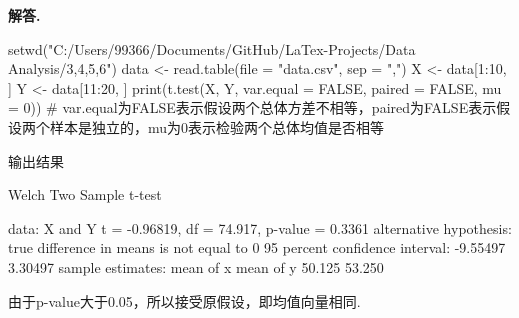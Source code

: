 \documentclass[12pt, a4paper, oneside]{ctexart}
\newenvironment{solution}[1][]{\par\noindent\textbf{#1解答. }}{\smallskip\par}  %
\begin{document}
\begin{solution}
    \begin{rcode}
setwd("C:/Users/99366/Documents/GitHub/LaTex-Projects/Data Analysis/3,4,5,6")
data <- read.table(file = "data.csv", sep = ",")
X <- data[1:10, ]
Y <- data[11:20, ]
print(t.test(X, Y, var.equal = FALSE, paired = FALSE, mu = 0))
# var.equal为FALSE表示假设两个总体方差不相等，paired为FALSE表示假设两个样本是独立的，mu为0表示检验两个总体均值是否相等
    \end{rcode}
    输出结果
    \begin{rcode}
        Welch Two Sample t-test

data:  X and Y
t = -0.96819, df = 74.917, p-value = 0.3361
alternative hypothesis: true difference in means is not equal to 0
95 percent confidence interval:
 -9.55497  3.30497
sample estimates:
mean of x mean of y
   50.125    53.250
    \end{rcode}
    由于p-value大于0.05，所以接受原假设，即均值向量相同.
\end{solution}
\end{document}

